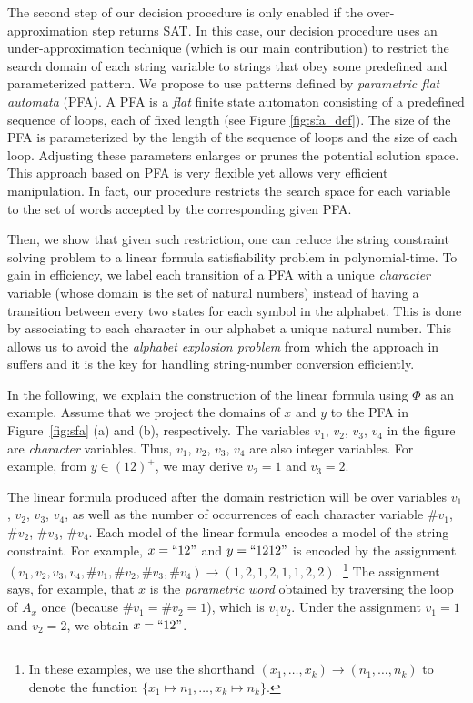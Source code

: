 \documentclass[sigplan,screen]{acmart}
\begin{document}
The second step of our decision procedure is only enabled if the over-approximation step returns SAT. In this case, our decision procedure uses an under-approximation technique (which is  our main contribution) to restrict the search domain of each string variable to strings that obey some predefined and parameterized pattern.  We propose to use patterns defined by \emph{parametric flat automata} (PFA). A PFA is a {\em flat} finite state automaton consisting of a predefined sequence of loops, each of fixed length (see Figure \ref{fig:sfa_def}). The size of the PFA is parameterized by the length of the sequence of loops and the size of each loop. Adjusting these parameters enlarges or prunes the potential solution space. This approach based on PFA is very flexible yet allows very efficient manipulation. In fact, our procedure restricts the search space for each variable to the set of words accepted by the corresponding given PFA. 


Then, we show that given such restriction, one can  reduce the string constraint solving problem to a linear formula satisfiability problem in polynomial-time. To gain in efficiency, we label each transition  of a PFA with a unique \emph{character} variable (whose domain is the set of natural numbers) instead of having a transition between every two states for each symbol in the alphabet.  This is done by associating to each character in our alphabet a unique natural number. This allows us to avoid the \textit{alphabet explosion problem} from which the approach in~\cite{abdulla2017flatten} suffers and it is  the key for handling string-number conversion efficiently. 




In the following, we explain the construction of the linear formula using $\Phi$ as an example. Assume that we project the domains of $x$ and $y$ to the PFA in Figure~\ref{fig:sfa} (a) and (b), respectively. The variables $v_1$, $v_2$, $v_3$, $v_4$ in the figure are \emph{character} variables. Thus, $v_1$, $v_2$, $v_3$, $v_4$ are also integer variables. For example, from  $ y \in (12)^+$, we may derive $v_2=1$ and $v_3=2$. 

The linear formula produced after the domain restriction will be over variables $v_1$, $v_2$, $v_3$, $v_4$, as well as the number of occurrences of each character variable $\#v_1$, $\#v_2$, $\#v_3$, $\#v_4$. Each model of the linear formula encodes a model of the string constraint. For example, $x=``12"$ and $y=``1212"$ is encoded by the assignment $(v_1,v_2,v_3,v_4,\#v_1,\#v_2,\#v_3,\#v_4) \rightarrow (1,2,1,2,1,1,2,2)$.%
\footnote{In these examples, we use the shorthand $(x_1,\ldots,x_k)\rightarrow(n_1,\ldots,n_k)$ to denote the function $\{x_1 \mapsto n_1,\ldots, x_k\mapsto n_k\}$.}
The assignment says, for example, that $x$ is the \emph{parametric word} obtained by traversing the loop of $A_x$ once (because $\#v_1 = \#v_2 = 1$), which is $v_1v_2$. Under the assignment $v_1=1$ and $v_2=2$, we obtain $x=``12"$.
\end{document}
